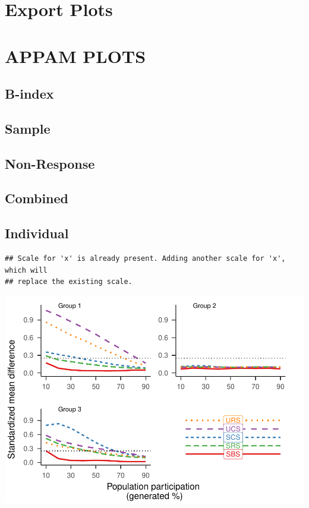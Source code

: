 \documentclass[
  english,
  man,floatsintext]{apa6}
\begin{document}
\hypertarget{export-plots}{%
\section{Export Plots}\label{export-plots}}

\hypertarget{appam-plots}{%
\section{APPAM PLOTS}\label{appam-plots}}

\hypertarget{b-index-1}{%
\subsection{B-index}\label{b-index-1}}

\hypertarget{sample}{%
\subsection{Sample}\label{sample}}

\hypertarget{non-response}{%
\subsection{Non-Response}\label{non-response}}

\hypertarget{combined}{%
\subsection{Combined}\label{combined}}

\hypertarget{individual}{%
\subsection{Individual}\label{individual}}

\begin{verbatim}
## Scale for 'x' is already present. Adding another scale for 'x', which will
## replace the existing scale.
\end{verbatim}

\includegraphics{5---Analysis_files/figure-latex/unnamed-chunk-46-1.pdf}
\end{document}
